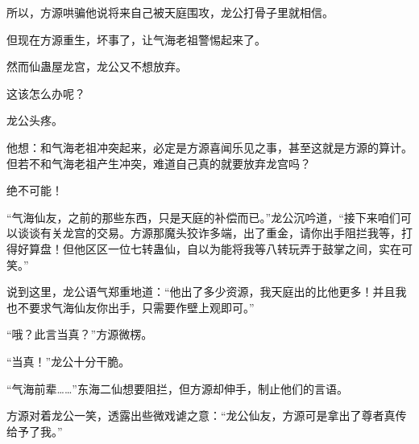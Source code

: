 \begin{this_body}
所以，方源哄骗他说将来自己被天庭围攻，龙公打骨子里就相信。

但现在方源重生，坏事了，让气海老祖警惕起来了。

然而仙蛊屋龙宫，龙公又不想放弃。

这该怎么办呢？

龙公头疼。

他想：和气海老祖冲突起来，必定是方源喜闻乐见之事，甚至这就是方源的算计。但若不和气海老祖产生冲突，难道自己真的就要放弃龙宫吗？

绝不可能！

“气海仙友，之前的那些东西，只是天庭的补偿而已。”龙公沉吟道，“接下来咱们可以谈谈有关龙宫的交易。方源那魔头狡诈多端，出了重金，请你出手阻拦我等，打得好算盘！但他区区一位七转蛊仙，自以为能将我等八转玩弄于鼓掌之间，实在可笑。”

说到这里，龙公语气郑重地道：“他出了多少资源，我天庭出的比他更多！并且我也不要求气海仙友你出手，只需要作壁上观即可。”

“哦？此言当真？”方源微楞。

“当真！”龙公十分干脆。

“气海前辈……”东海二仙想要阻拦，但方源却伸手，制止他们的言语。

方源对着龙公一笑，透露出些微戏谑之意：“龙公仙友，方源可是拿出了尊者真传给予了我。”

\end{this_body}

